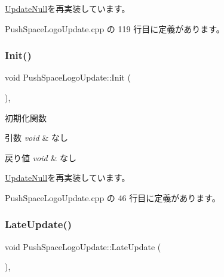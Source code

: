 \mbox{\hyperlink{class_update_null_a98c7241e5ef276510830eb6df9ed0fbb}{Update\+Null}}を再実装しています。



 Push\+Space\+Logo\+Update.\+cpp の 119 行目に定義があります。

\mbox{\label{class_push_space_logo_update_a9c165604160c012b429c1db1d67ffb2a}} 
\subsubsection{\texorpdfstring{Init()}{Init()}}
{\footnotesize\ttfamily void Push\+Space\+Logo\+Update\+::\+Init (\begin{DoxyParamCaption}{ }\end{DoxyParamCaption})\hspace{0.3cm}{\ttfamily [override]}, {\ttfamily [virtual]}}



初期化関数 


\begin{DoxyParams}{引数}
{\em void} & なし \\
\hline
\end{DoxyParams}

\begin{DoxyRetVals}{戻り値}
{\em void} & なし \\
\hline
\end{DoxyRetVals}


\mbox{\hyperlink{class_update_null_aaa8f5fe1f03e252ad75eb8c888a5bf46}{Update\+Null}}を再実装しています。



 Push\+Space\+Logo\+Update.\+cpp の 46 行目に定義があります。

\mbox{\label{class_push_space_logo_update_a4423864fb22b1211e92a4317d0b70a44}} 
\subsubsection{\texorpdfstring{Late\+Update()}{LateUpdate()}}
{\footnotesize\ttfamily void Push\+Space\+Logo\+Update\+::\+Late\+Update (\begin{DoxyParamCaption}{ }\end{DoxyParamCaption})\hspace{0.3cm}{\ttfamily [override]}, {\ttfamily [virtual]}}



